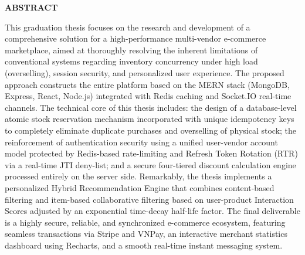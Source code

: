 \documentclass[../DoAn.tex]{subfiles}
\begin{document}
\begin{center}
    \Large{\textbf{ABSTRACT}}\\
\end{center}
\vspace{1cm}

This graduation thesis focuses on the research and development of a comprehensive solution for a high-performance multi-vendor e-commerce marketplace, aimed at thoroughly resolving the inherent limitations of conventional systems regarding inventory concurrency under high load (overselling), session security, and personalized user experience. The proposed approach constructs the entire platform based on the MERN stack (MongoDB, Express, React, Node.js) integrated with Redis caching and Socket.IO real-time channels. The technical core of this thesis includes: the design of a database-level atomic stock reservation mechanism incorporated with unique idempotency keys to completely eliminate duplicate purchases and overselling of physical stock; the reinforcement of authentication security using a unified user-vendor account model protected by Redis-based rate-limiting and Refresh Token Rotation (RTR) via a real-time JTI deny-list; and a secure four-tiered discount calculation engine processed entirely on the server side. Remarkably, the thesis implements a personalized Hybrid Recommendation Engine that combines content-based filtering and item-based collaborative filtering based on user-product Interaction Scores adjusted by an exponential time-decay half-life factor. The final deliverable is a highly secure, reliable, and synchronized e-commerce ecosystem, featuring seamless transactions via Stripe and VNPay, an interactive merchant statistics dashboard using Recharts, and a smooth real-time instant messaging system.
\end{document}
